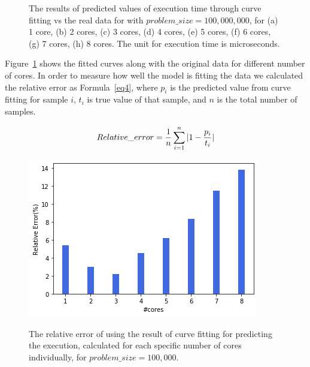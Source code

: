 \begin{figure}[H]
{	\label{fig43:g}}
\hfill
	\caption{The results of predicted values of execution time through curve fitting vs the real data for with $problem\_size=100,000,000$, for (a) 1 core, (b) 2 cores, (c) 3 cores, (d) 4 cores, (e) 5 cores, (f) 6 cores, (g) 7 cores, (h) 8 cores. The unit for execution time is microseconds.}
	\label{fig43}	
\end{figure}


Figure~\ref{fig43} shows the fitted curves along with the original data for different number of cores.
In order to measure how well the model is fitting the data we calculated the relative error as Formula~\ref{eq4}, where $p_i$ is the predicted value from curve fitting for sample $i$, $t_i$ is true value of that sample, and $n$ is the total number of samples.


\begin{equation}{\label{eq4}}
Relative\_{error} = \frac{1}{n}\sum_{i=1}^{n} {|1-\frac{p_i}{t_i}|}
\end{equation}

\begin{figure}[H]
	\centering
	{\includegraphics[scale=.45]{images/hpx_for_loop/fitted/marvin_relative_error_100000000.png}}	\caption{The relative error of using the result of curve fitting for predicting the execution, calculated for each specific number of cores individually, for $problem\_size=100,000$.}\label{fig44}		
\end{figure}



